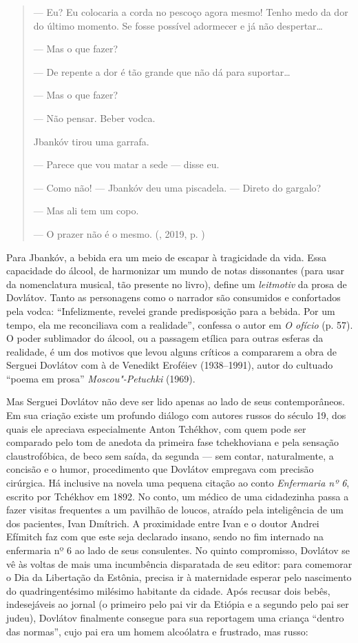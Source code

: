\begin{quotation}
--- Eu? Eu colocaria a corda no pescoço agora mesmo! Tenho medo da dor
do último momento. Se fosse possível adormecer e já não despertar\ldots{}

--- Mas o que fazer?

--- De repente a dor é tão grande que não dá para suportar\ldots{}

--- Mas o que fazer?

--- Não pensar. Beber vodca.

Jbankóv tirou uma garrafa.

--- Parece que vou matar a sede --- disse eu.

--- Como não! --- Jbankóv deu uma piscadela. --- Direto do gargalo?

--- Mas ali tem um copo.

--- O prazer não é o mesmo.
{}(, 2019, p. \pageref{ref01})
\end{quotation}

Para Jbankóv, a bebida era um meio de escapar à tragicidade da vida.
Essa capacidade do álcool, de harmonizar um mundo de notas dissonantes
(para usar da nomenclatura musical, tão presente no livro), define um
\emph{leitmotiv} da prosa de Dovlátov. Tanto as personagens como o
narrador são consumidos e confortados pela vodca: ``Infelizmente,
revelei grande predisposição para a bebida. Por um tempo, ela me
reconciliava com a realidade'', confessa o autor em \emph{O ofício} (p.
57). O poder sublimador do álcool, ou a passagem etílica para outras
esferas da realidade, é um dos motivos que levou alguns críticos a
compararem a obra de Serguei Dovlátov com à de Venedikt Eroféiev
(1938--1991), autor do cultuado ``poema em prosa''
\emph{Moscou"-Petuchki} (1969).

Mas Serguei Dovlátov não deve ser lido apenas ao lado de seus
contemporâneos. Em sua criação existe um profundo diálogo com autores
russos do século 19, dos quais ele apreciava especialmente Anton
Tchékhov, com quem pode ser comparado pelo tom de anedota da primeira
fase tchekhoviana e pela sensação claustrofóbica, de beco sem saída, da
segunda --- sem contar, naturalmente, a concisão e o humor, procedimento
que Dovlátov empregava com precisão cirúrgica. Há inclusive na novela
uma pequena citação ao conto \emph{Enfermaria nº 6}, escrito por
Tchékhov em 1892. No conto, um médico de uma cidadezinha passa a fazer
visitas frequentes a um pavilhão de loucos, atraído pela inteligência de
um dos pacientes, Ivan Dmítrich. A proximidade entre Ivan e o doutor
Andrei Efímitch faz com que este seja declarado insano, sendo no fim
internado na enfermaria nº 6 ao lado de seus consulentes. No quinto
compromisso, Dovlátov se vê às voltas de mais uma incumbência
disparatada de seu editor: para comemorar o Dia da Libertação da
Estônia, precisa ir à maternidade esperar pelo nascimento do
quadringentésimo milésimo habitante da cidade. Após recusar dois bebês,
indesejáveis ao jornal (o primeiro pelo pai vir da Etiópia e a segundo
pelo pai ser judeu), Dovlátov finalmente consegue para sua reportagem
uma criança ``dentro das normas'', cujo pai era um homem alcoólatra e
frustrado, mas russo:

